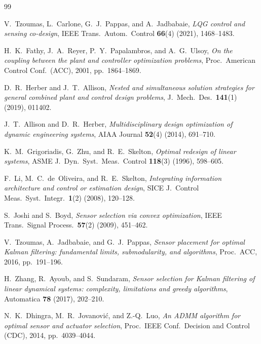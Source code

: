 \documentclass[11pt]{article}
\begin{document}
\begin{thebibliography}{99}

V.~Tzoumas, L.~Carlone, G.~J.~Pappas, and A.~Jadbabaie,
\emph{LQG control and sensing co-design},
IEEE Trans.\ Autom.\ Control \textbf{66}(4) (2021), 1468--1483.

H.~K.~Fathy, J.~A.~Reyer, P.~Y.~Papalambros, and A.~G.~Ulsoy,
\emph{On the coupling between the plant and controller optimization problems},
Proc.\ American Control Conf.\ (ACC), 2001, pp.~1864--1869.

D.~R.~Herber and J.~T.~Allison,
\emph{Nested and simultaneous solution strategies for general combined plant and
control design problems},
J.\ Mech.\ Des.\ \textbf{141}(1) (2019), 011402.

J.~T.~Allison and D.~R.~Herber,
\emph{Multidisciplinary design optimization of dynamic engineering systems},
AIAA Journal \textbf{52}(4) (2014), 691--710.

K.~M.~Grigoriadis, G.~Zhu, and R.~E.~Skelton,
\emph{Optimal redesign of linear systems},
ASME J.\ Dyn.\ Syst.\ Meas.\ Control \textbf{118}(3) (1996), 598--605.

F.~Li, M.~C.~de~Oliveira, and R.~E.~Skelton,
\emph{Integrating information architecture and control or estimation design},
SICE J.\ Control Meas.\ Syst.\ Integr.\ \textbf{1}(2) (2008), 120--128.

S.~Joshi and S.~Boyd,
\emph{Sensor selection via convex optimization},
IEEE Trans.\ Signal Process.\ \textbf{57}(2) (2009), 451--462.

V.~Tzoumas, A.~Jadbabaie, and G.~J.~Pappas,
\emph{Sensor placement for optimal Kalman filtering: fundamental limits,
submodularity, and algorithms},
Proc.\ ACC, 2016, pp.~191--196.

H.~Zhang, R.~Ayoub, and S.~Sundaram,
\emph{Sensor selection for Kalman filtering of linear dynamical systems:
complexity, limitations and greedy algorithms},
Automatica \textbf{78} (2017), 202--210.

N.~K.~Dhingra, M.~R.~Jovanovi\'c, and Z.-Q.~Luo,
\emph{An ADMM algorithm for optimal sensor and actuator selection},
Proc.\ IEEE Conf.\ Decision and Control (CDC), 2014, pp.~4039--4044.


\end{thebibliography}
\end{document}
